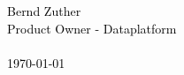 \newcommand{\cccvname}{Bernd Zuther}
\newcommand{\cccvjobtitle}{Product Owner - Dataplatform}

\NoBgThispage
\vspace*{18.5cm}
\noindent
\textcolor{black}{
{\Huge \cccvname}\\[8pt]
{\huge \cccvjobtitle}\\
\\[8pt]
{\today}
}
